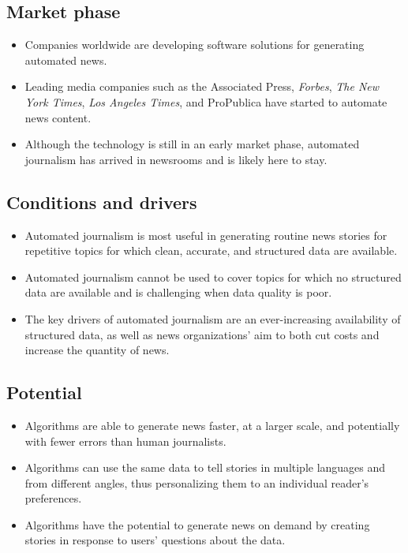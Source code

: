 \documentclass[notoc, symmetric, nobib, nols]{towcenter-guideto-book}
\begin{document}
\subsection{Market phase} 
\begin{itemize}
\item Companies worldwide are developing software solutions for generating automated news.
\item Leading media companies such as the Associated Press, \textit{Forbes}, \textit{The New York Times}, \textit{Los Angeles Times}, and ProPublica have started to automate news content.
\item Although the technology is still in an early market phase, automated journalism has arrived in newsrooms and is likely here to stay. 
\end{itemize}

\subsection{Conditions and drivers}
\begin{itemize}
\item Automated journalism is most useful in generating routine news stories for repetitive topics for which clean, accurate, and structured data are available. 
\item Automated journalism cannot be used to cover topics for which no structured data are available and is challenging when data quality is poor. 
\item The key drivers of automated journalism are an ever-increasing availability of structured data, as well as news organizations' aim to both cut costs and increase the quantity of news.
\end{itemize}

\subsection{Potential}
\begin{itemize}
\item Algorithms are able to generate news faster, at a larger scale, and potentially with fewer errors than human journalists. 
\item Algorithms can use the same data to tell stories in multiple languages and from different angles, thus personalizing them to an individual reader's preferences. 
\item Algorithms have the potential to generate news on demand by creating stories in response to users' questions about the data.
\end{itemize}
\end{document}
